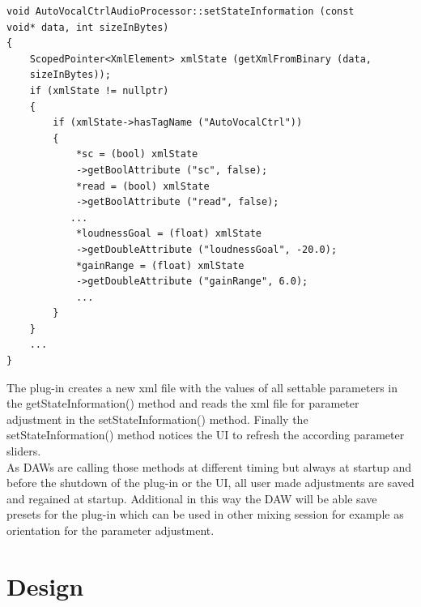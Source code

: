\begin{lstlisting}[frame=single]
void AutoVocalCtrlAudioProcessor::setStateInformation (const 
void* data, int sizeInBytes)
{
    ScopedPointer<XmlElement> xmlState (getXmlFromBinary (data, 
    sizeInBytes));
    if (xmlState != nullptr)
    {
        if (xmlState->hasTagName ("AutoVocalCtrl"))
        {
            *sc = (bool) xmlState
            ->getBoolAttribute ("sc", false);
            *read = (bool) xmlState
            ->getBoolAttribute ("read", false);
           ...
            *loudnessGoal = (float) xmlState
            ->getDoubleAttribute ("loudnessGoal", -20.0);
            *gainRange = (float) xmlState
            ->getDoubleAttribute ("gainRange", 6.0);
            ...
        }
    }
    ...
}
\end{lstlisting}

The plug-in creates a new xml file with the values of all settable parameters in the getStateInformation() method and reads the xml file for parameter adjustment in the setStateInformation() method. Finally the setStateInformation() method notices the UI to refresh the according parameter sliders.\\
As DAWs are calling those methods at different timing but always at startup and before the shutdown of the plug-in or the UI, all user made adjustments are saved and regained at startup. Additional in this way the DAW will be able save presets for the plug-in which can be used in other mixing session for example as orientation for the parameter adjustment.\\

\section{Design}

